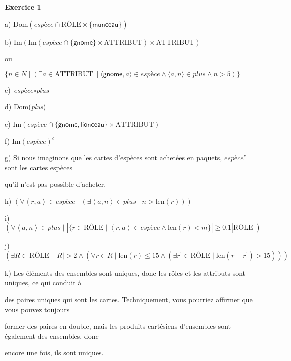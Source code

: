 \documentclass{article}
\newcommand{\role}{\mbox{RÔLE}}
\newcommand{\attribut}{\mbox{ATTRIBUT}}
\newcommand{\compose}{\circ}
\newcommand{\tuple}[1]{\ensuremath{\left\langle #1 \right\rangle}}
\begin{document}
\textbf{Exercice 1}

a) $\text{Dom}(\textit{espèce} \cap \role \times \{ \textsf{munceau} \} )$

\vspace{0.5cm}

b) $ \text{Im}( \text{Im}( \textit{espèce} \cap \{ \textsf{gnome} \} \times \attribut ) \times \attribut ) $ 

ou

$\{ n \in N \mid (\exists a \in \attribut\ \mid \langle \textsf{gnome},a  \rangle \in \textit{espèce} \land \langle a,n \rangle \in \textit{plus} \land n > 5 )\}$

\vspace{0.5cm}

c) $\textit{espèce} \compose \textit{plus}$

\vspace{0.5cm}

d) Dom(\textit{plus})

\vspace{0.5cm}

e) $ \text{Im}(\textit{espèce} \cap \{ \textsf{gnome}, \textsf{lionceau} \} \times \attribut)$

\vspace{0.5cm}

f) $ \text{Im}(\textit{espèce})^{c} $

\vspace{0.5cm}

g) Si nous imaginons que les cartes d'espèces sont achetées en paquets, $\textit{espèce}^{c}$ sont les cartes espèces 

qu'il n'est pas possible d'acheter.

\vspace{0.5cm}

h) $( \forall \tuple{r,a} \in \textit{espèce} \mid ( \exists \tuple{a,n} \in \textit{plus} \mid n > \text{len}(r) ))$

\vspace{0.5cm}

i) $ (  \forall \tuple{a,n} \in \textit{plus} \mid |\{ r \in \role \mid \tuple{r,a} \in \textit{espèce} \land \text{len}(r) < m \}| \geq 0.1 | \role | ) $

\vspace{0.5cm}

j) $( \exists R \subset \role \mid |R| > 2 \land ( \forall r \in R \mid \text{len}(r) \leq 15 \land ( \exists r^{\prime} \in \role \mid \text{len}(r - r^{\prime}) > 15 ) ) ) $

\vspace{0.5cm}

k) Les éléments des ensembles sont uniques, donc les rôles et les attributs sont uniques, ce qui conduit à

des paires uniques qui sont les cartes. Techniquement, vous pourriez affirmer que vous pouvez toujours 

former des paires en double, mais les produits cartésiens d'ensembles sont également des ensembles, donc 

encore une fois, ils sont uniques.
\end{document}
